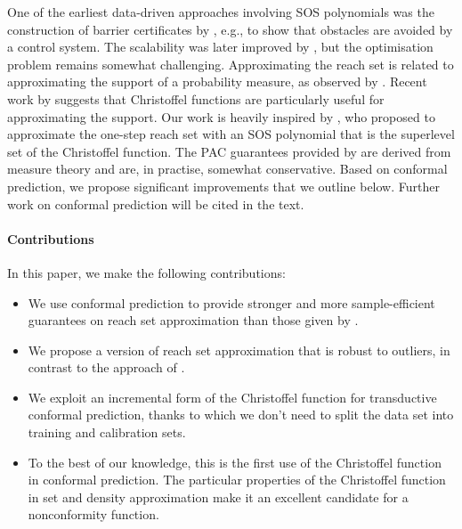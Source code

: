 \documentclass[pmlr]{jmlr}%
\begin{document}
One of the earliest data-driven approaches involving SOS polynomials was the construction of barrier certificates by \cite{prajna2006barrier}, e.g., to show that obstacles are avoided by a control system. The scalability was later improved by \cite{7402508}, but the optimisation problem remains somewhat challenging.
%
%
Approximating the reach set is related to approximating the support of a probability measure, as observed by \cite{devonport}. Recent work by \cite{lasserre2019empirical,CRMATH_2022__360_G8_919_0} suggests that Christoffel functions are particularly useful for approximating the support. 
Our work is heavily inspired by \cite{devonport}, who proposed to approximate the one-step reach set with an SOS polynomial that is the superlevel set of the Christoffel function.
%
The PAC guarantees provided by \cite{devonport} are derived from measure theory and are, in practise, somewhat conservative. Based on conformal prediction, we propose significant improvements that we outline below.
%
Further work on conformal prediction will be cited in the text. 

\paragraph{Contributions}
%
In this paper, we make the following contributions:
\begin{itemize}
\itemsep=0ex
\item 
We use conformal prediction to provide stronger and more sample-efficient guarantees on reach set approximation than those given by \cite{devonport}.
\item We propose a version of reach set approximation that is robust to outliers, in contrast to the approach of \cite{devonport}. 
\item We exploit an incremental form of the Christoffel function for transductive conformal prediction, thanks to which we don't need to split the data set into training and calibration sets.
\item To the best of our knowledge, this is the first use of the Christoffel function in conformal prediction. The particular properties of the Christoffel function in set and density approximation make it an excellent candidate for a nonconformity function.
\end{itemize}

%
%
\end{document}
